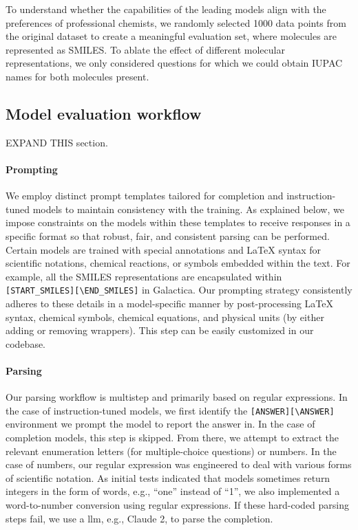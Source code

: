 \documentclass[11pt, oneside]{article}
\begin{document}
\begin{refsection}
To understand whether the capabilities of the leading models align with the preferences of professional chemists, we randomly selected 1000 data points from the original dataset to create a meaningful evaluation set, where molecules are represented as SMILES.
To ablate the effect of different molecular representations, we only considered questions for which we could obtain IUPAC names for both molecules present.

\clearpage

\subsection{Model evaluation workflow}
EXPAND THIS section. 

\paragraph{Prompting}

We employ distinct prompt templates tailored for completion and instruction-tuned models to maintain consistency with the training. 
As explained below, we impose constraints on the models within these templates to receive responses in a specific format so that robust, fair, and consistent parsing can be performed.
Certain models are trained with special annotations and \LaTeX\xspace syntax for scientific notations, chemical reactions, or symbols embedded within the text. 
For example, all the SMILES representations are encapsulated within \texttt{[START\_SMILES][\textbackslash END\_SMILES]} in Galactica\autocite{taylor2022galactica}.
Our prompting strategy consistently adheres to these details in a model-specific manner by post-processing \LaTeX\xspace syntax, chemical symbols, chemical equations, and physical units (by either adding or removing wrappers).
This step can be easily customized in our codebase.



\paragraph{Parsing}
Our parsing workflow is multistep and primarily based on regular expressions.
In the case of instruction-tuned models, we first identify the \texttt{[ANSWER]}\texttt{[\textbackslash ANSWER]} environment we prompt the model to report the answer in.
In the case of completion models, this step is skipped. From there, we attempt to extract the relevant enumeration letters (for multiple-choice questions) or numbers.
In the case of numbers, our regular expression was engineered to deal with various forms of scientific notation.
As initial tests indicated that models sometimes return integers in the form of words, e.g., \enquote{one} instead of \enquote{1}, we also implemented a word-to-number conversion using regular expressions.
If these hard-coded parsing steps fail, we use a \gls{llm}, e.g., Claude 2, to parse the completion.



\end{refsection}
\end{document}
